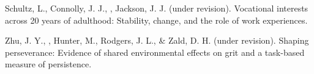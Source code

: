 
\item Schultz, L., Connolly, J. J., \meb, Jackson, J. J. (under revision). Vocational interests across 20 years of adulthood: Stability, change, and the role of work experiences.
\item Zhu, J. Y., \meb, Hunter, M., Rodgers, J. L., \& Zald, D. H. (under revision). Shaping perseverance: Evidence of shared environmental effects on grit and a task-based measure of persistence.
\vspace{-2mm}\begin{center}\end{center} \vspace{-4mm}
